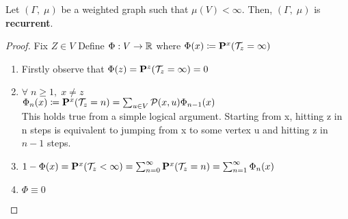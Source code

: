 \documentclass[main]{subfiles}
\begin{document}
\begin{lemma}
    Let $(\Gamma,\;\mu)$ be a weighted graph such that $\mu(V) < \infty$.
    Then, $(\Gamma,\;\mu)$ is \textbf{recurrent}.
    \begin{proof}
        Fix $Z \in V$
        Define $\Phi: V \to \mathbb R$ where $\Phi(x) \coloneqq \mathbf P^x(\mathcal T_z = \infty)$
        \begin{enumerate}
            \item Firstly observe that $\Phi(z) = \mathbf P^z(\mathcal T_z = \infty) = 0$
            \item $\forall \;n \geq 1, \; x \neq z$\\
                  $\Phi_n(x) \coloneqq \mathbf P^x(\mathcal T_z = n) = \sum_{u \in V}\mathcal{P}(x, u)\Phi_{n-1}(x)$\\

                  This holds true from a simple logical argument. Starting from x, hitting z in n steps is equivalent to jumping from x to some vertex u and hitting z in $n-1$ steps.
            \item $1-\Phi(x) = \mathbf P^x(\mathcal T_z < \infty) = \sum_{n=0}^\infty\mathbf P^x(\mathcal T_z=n)=\sum_{n=1}^\infty\Phi_n(x)$
            \item $\Phi \equiv 0$


\end{enumerate}
\end{proof}
\end{lemma}
\end{document}
